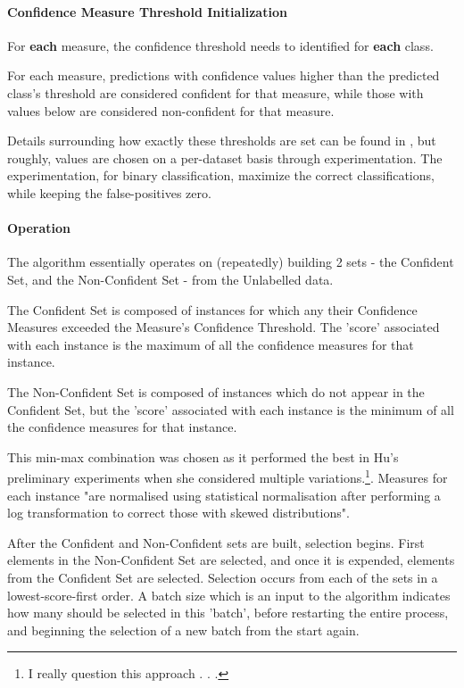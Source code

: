 \documentclass[a4paper,11pt]{report}
\begin{document}
\paragraph{Confidence Measure Threshold Initialization}
For \textbf{each} measure, the confidence threshold needs to identified for \textbf{each} class.

For each measure, predictions with confidence values higher than the predicted class's threshold are considered confident for that measure, while those with values below are considered non-confident for that measure.

Details surrounding how exactly these thresholds are set can be found in \citet{Delany2005}, but roughly, values are chosen on a per-dataset basis through experimentation. The experimentation, for binary classification, maximize the correct classifications, while keeping the false-positives zero.

\paragraph{Operation}
The algorithm essentially operates on (repeatedly) building 2 sets - the Confident Set, and the Non-Confident Set - from the Unlabelled data.

The Confident Set is composed of instances for which any their Confidence Measures exceeded the Measure's Confidence Threshold. The 'score' associated with each instance is the maximum of all the confidence measures for that instance.

The Non-Confident Set is composed of instances which do not appear in the Confident Set, but the 'score' associated with each instance is the minimum of all the confidence measures for that instance. 

This min-max combination was chosen as it performed the best in Hu's preliminary experiments when she considered multiple variations.\footnote{I really question this approach . . .}. Measures for each instance "are normalised using statistical normalisation after performing a log transformation to correct those with skewed distributions"\cite{Hu2011}.

After the Confident and Non-Confident sets are built, selection begins. First elements in the Non-Confident Set are selected, and once it is expended, elements from the Confident Set are selected. Selection occurs from each of the sets in a lowest-score-first order. A batch size which is an input to the algorithm indicates how many should be selected in this 'batch', before restarting the entire process, and beginning the selection of a new batch from the start again.
\end{document}
